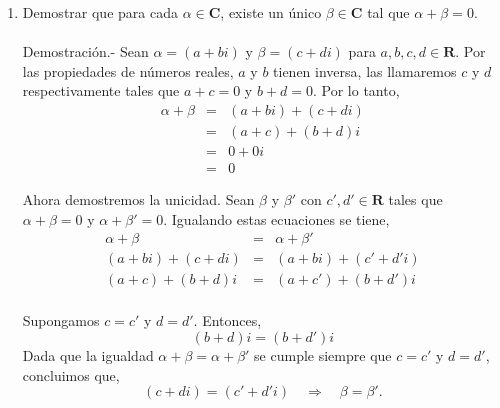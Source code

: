 \begin{enumerate}[\bfseries 1.]
    \item Demostrar que para cada $\alpha \in \textbf{C}$, existe un único $\beta\in \textbf{C}$ tal que $\alpha+\beta=0$.\\\\
	Demostración.-\; Sean $\alpha=(a+bi)$ y $\beta=(c+di)$ para $a,b,c,d\in \textbf{R}$. Por las propiedades de números reales, $a$ y $b$ tienen inversa, las llamaremos $c$ y $d$ respectivamente tales que $a+c=0$ y $b+d=0$. Por lo tanto,
	$$\begin{array}{rcl}
	    \alpha+\beta &=& (a+bi)+(c+di)\\
			 &=& (a+c)+(b+d)i\\
			 &=& 0 + 0i\\
			 &=& 0
	\end{array}$$

	Ahora demostremos la unicidad. Sean $\beta$ y $\beta'$ con $c',d'\in \textbf{R}$ tales que $\alpha+\beta=0$ y $\alpha+\beta'=0$. Igualando estas ecuaciones se tiene,
	$$\begin{array}{rcl}
	    \alpha+\beta&=&\alpha+\beta'\\
	    (a+bi)+(c+di)&=&(a+bi)+(c'+d'i)\\
	    (a+c)+(b+d)i&=&(a+c')+(b+d')i\\
	\end{array}$$

	Supongamos $c=c'$ y $d=d'$. Entonces,
	$$(b+d)i=(b+d')i$$
	Dada que la igualdad $\alpha+\beta=\alpha+\beta'$ se cumple siempre que $c=c'$ y $d=d'$, concluimos que,
	$$(c+di)=(c'+d'i)\quad \Rightarrow \quad \beta=\beta'.$$\\


\end{enumerate}
